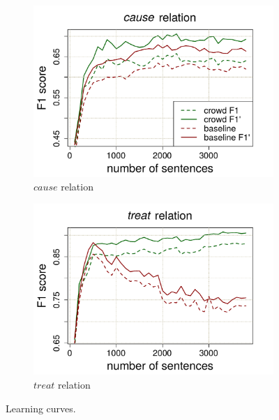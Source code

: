\begin{figure}[htb!]
\centering
\begin{subfigure}{.5\textwidth}
\includegraphics[width=\linewidth]{img/cause_w.pdf}
\caption{$cause$ relation}
\label{fig:cause_3800}
\end{subfigure}%
\begin{subfigure}{.5\textwidth}
\includegraphics[width=\linewidth]{img/treat_w.pdf}
\caption{$treat$ relation}
\label{fig:treat_3800}
\end{subfigure}
\caption{Learning curves.}
\end{figure}


